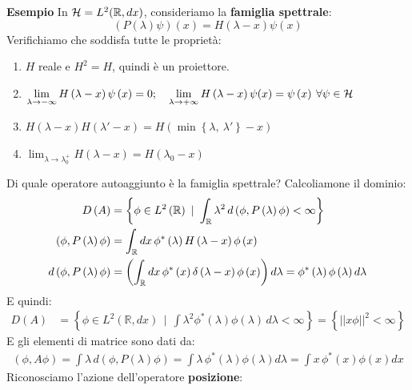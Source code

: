 \textbf{Esempio} 
In $\mathcal{H} =L^2(\mathbb{R}, dx)$, consideriamo la \textbf{famiglia spettrale}:
\[
\left(P\left(\lambda\right)\psi\right)\left(x\right)=H\left(\lambda-x\right)\psi \left(x\right)
\]
Verifichiamo che soddisfa tutte le proprietà:
\begin{enumerate}
    \item $H$ reale e $H^2=H$, quindi è un proiettore.
    \item 
    $\displaystyle \lim_{\lambda\rightarrow-\infty}{H\left(\lambda-x\right)\psi\left(x\right)=0};
    \quad
	\lim_{\lambda\rightarrow+\infty}{H\left(\lambda-x\right)\psi(x)}=\psi
	\left(x\right)\>\forall \psi \in \mathcal{H} $
    \item 
    $\displaystyle H\left(\lambda-x\right)H\left(\lambda '-x\right)=H\left(\min{\left\{\lambda,\ \lambda '\right\}}-x\right)$
    \item 
    $\displaystyle \lim_{\lambda\rightarrow\lambda_0^+}{H\left(\lambda-x\right)}=H\left(\lambda_0-x\right)$
\end{enumerate}
Di quale operatore autoaggiunto è la famiglia spettrale? Calcoliamone il dominio:
\begin{align*}
D\left(A\right)&= \left\{\phi\in L^2\left(\mathbb{R}\right)\ |\ \int_\bb{R}\lambda^2\, d\left(\phi,P\left(\lambda\right)\phi\right)<\infty\right\}\\
\left(\phi,P\left(\lambda\right)\phi\right)&=\int_\bb{R} dx\, \phi^\ast\left(\lambda\right)H\left(\lambda-x\right)\phi \left(x\right)\\
d\left(\phi,P\left(\lambda\right)\phi\right)&=\left(\int_\bb{R} dx\,\phi^\ast\left(x\right)\delta\left(\lambda-x\right)\phi\left(x\right)\right)d\lambda =\phi^\ast\left(\lambda\right)\phi \left(\lambda\right)d\lambda 
\end{align*}
E quindi:
\begin{align*}
D\left(A\right)&= \left\{\phi\in L^2\left(\mathbb{R},dx\right)\ \ |\ \ \int\lambda^2\phi^\ast\left(\lambda\right)\phi\left(\lambda\right)\,d\lambda<\infty\right\}= \left\{\left|\left|x\phi\right|\right|^2<\infty\right\}
\end{align*}
E gli elementi di matrice sono dati da:
\begin{align*}
    \left(\phi,A\phi\right)=\int \lambda\, d\left(\phi,P\left(\lambda\right)\phi\right)= \int \lambda\,\phi^\ast\left(\lambda\right)\phi \left(\lambda\right)d\lambda =\int x\,\phi^\ast\left(x\right)\phi \left(x\right)dx
\end{align*}
Riconosciamo l'azione dell'operatore \textbf{posizione}:
